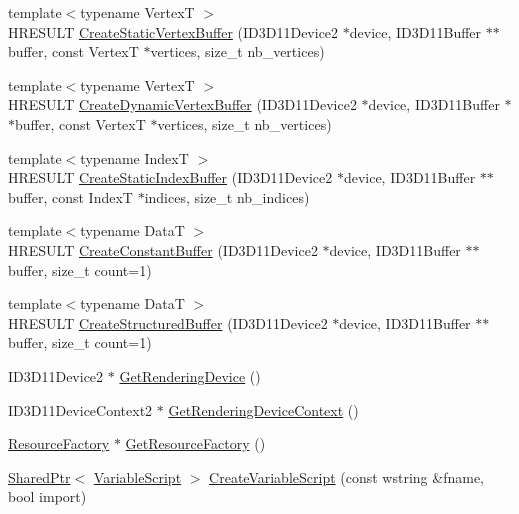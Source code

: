\begin{DoxyCompactItemize}
\item 
{\footnotesize template$<$typename VertexT $>$ }\\H\+R\+E\+S\+U\+LT \hyperlink{namespacemage_a7cf0754e3bc2681bc1990e64f4155032}{Create\+Static\+Vertex\+Buffer} (I\+D3\+D11\+Device2 $\ast$device, I\+D3\+D11\+Buffer $\ast$$\ast$buffer, const VertexT $\ast$vertices, size\+\_\+t nb\+\_\+vertices)
\item 
{\footnotesize template$<$typename VertexT $>$ }\\H\+R\+E\+S\+U\+LT \hyperlink{namespacemage_aeb9bab1a9d739e3908c90db3832d9053}{Create\+Dynamic\+Vertex\+Buffer} (I\+D3\+D11\+Device2 $\ast$device, I\+D3\+D11\+Buffer $\ast$$\ast$buffer, const VertexT $\ast$vertices, size\+\_\+t nb\+\_\+vertices)
\item 
{\footnotesize template$<$typename IndexT $>$ }\\H\+R\+E\+S\+U\+LT \hyperlink{namespacemage_a6d7b762686800ea46b6f56dbfa0727a2}{Create\+Static\+Index\+Buffer} (I\+D3\+D11\+Device2 $\ast$device, I\+D3\+D11\+Buffer $\ast$$\ast$buffer, const IndexT $\ast$indices, size\+\_\+t nb\+\_\+indices)
\item 
{\footnotesize template$<$typename DataT $>$ }\\H\+R\+E\+S\+U\+LT \hyperlink{namespacemage_a5eed34f604a40811bb0282dff7e6e712}{Create\+Constant\+Buffer} (I\+D3\+D11\+Device2 $\ast$device, I\+D3\+D11\+Buffer $\ast$$\ast$buffer, size\+\_\+t count=1)
\item 
{\footnotesize template$<$typename DataT $>$ }\\H\+R\+E\+S\+U\+LT \hyperlink{namespacemage_a9090692dded3dfa6abbcb2023b1e6327}{Create\+Structured\+Buffer} (I\+D3\+D11\+Device2 $\ast$device, I\+D3\+D11\+Buffer $\ast$$\ast$buffer, size\+\_\+t count=1)
\item 
I\+D3\+D11\+Device2 $\ast$ \hyperlink{namespacemage_a30c7feb10b2be75bbce6d9c3739899c6}{Get\+Rendering\+Device} ()
\item 
I\+D3\+D11\+Device\+Context2 $\ast$ \hyperlink{namespacemage_a55d3eaa7476e19ec8969e27d69249d95}{Get\+Rendering\+Device\+Context} ()
\item 
\hyperlink{classmage_1_1_resource_factory}{Resource\+Factory} $\ast$ \hyperlink{namespacemage_a36a7338e52586e714ef646dea200a115}{Get\+Resource\+Factory} ()
\item 
\hyperlink{namespacemage_a1e01ae66713838a7a67d30e44c67703e}{Shared\+Ptr}$<$ \hyperlink{classmage_1_1_variable_script}{Variable\+Script} $>$ \hyperlink{namespacemage_a4ee2d46e5220246892bb34b7d1e97fbe}{Create\+Variable\+Script} (const wstring \&fname, bool import)
$$
\end{DoxyCompactItemize}
